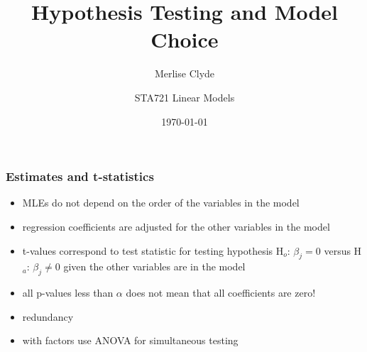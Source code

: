 \documentclass[]{beamer}
\title{Hypothesis Testing and Model Choice}
\subtitle{Merlise Clyde}
\author{STA721 Linear Models}
\institute{Duke University}
\date{\today}
\begin{document}
\maketitle
\begin{frame}
  \frametitle{Estimates and t-statistics}
  \begin{itemize}
  \item MLEs do not depend on the order of the variables in the model \pause
  \item regression coefficients are adjusted for the other variables
    in the model \pause
  \item t-values correspond to test statistic for testing hypothesis
    H$_o$: $\beta_j = 0$ versus H$_a$: $\beta_j \neq 0$ given  the
    other variables are in the model \pause
  \item all p-values less than $\alpha$ does not mean that all
    coefficients are zero! \pause
 \item redundancy \pause
 \item with factors use ANOVA for simultaneous testing \pause
  \end{itemize}
\end{frame}
\end{document}
